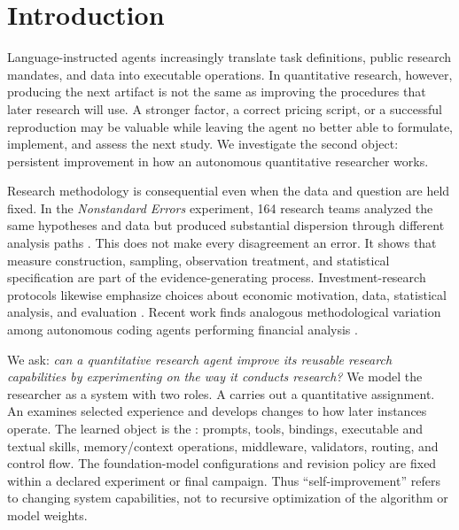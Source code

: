 \section{Introduction}

Language-instructed agents increasingly translate task definitions, public
research mandates, and data into executable operations.  In quantitative
research, however, producing the next artifact is not the same as improving
the procedures that later research will use.  A stronger factor, a correct
pricing script, or a successful reproduction may be valuable while leaving
the agent no better able to formulate, implement, and assess the next study.
We investigate the second object: persistent improvement in how an autonomous
quantitative researcher works.

Research methodology is consequential even when the data and question are
held fixed.  In the \emph{Nonstandard Errors} experiment, 164 research teams
analyzed the same hypotheses and data but produced substantial dispersion
through different analysis paths \citep{menkveld2024nonstandard}.  This does
not make every disagreement an error.  It shows that measure construction,
sampling, observation treatment, and statistical specification are part of
the evidence-generating process.  Investment-research protocols likewise
emphasize choices about economic motivation, data, statistical analysis, and
evaluation \citep{arnott2019backtesting}.  Recent work finds analogous
methodological variation among autonomous coding agents performing financial
analysis \citep{gao2026nonstandard}.

We ask: \emph{can a quantitative research agent improve its reusable research
capabilities by experimenting on the way it conducts research?}  We model the
researcher as a system with two roles.  A \Worker{} carries out a quantitative
assignment.  An \Evolver{} examines selected experience and develops changes
to how later \Worker{} instances operate.  The learned object is the
\fullharness{}: prompts, tools, bindings, executable and textual skills,
memory/context operations, middleware, validators, routing, and control flow.
The foundation-model configurations and revision policy are fixed within a
declared experiment or final campaign. Thus
``self-improvement'' refers to changing system capabilities, not to recursive
optimization of the \Evolver{} algorithm or model weights.

